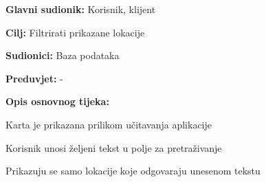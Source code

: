 					\noindent {}
					\begin{packed_item}
	
						\item \textbf{Glavni sudionik: }Korisnik, klijent
						\item  \textbf{Cilj:} Filtrirati prikazane lokacije
						\item  \textbf{Sudionici:} Baza podataka
						\item  \textbf{Preduvjet:} -
						\item  \textbf{Opis osnovnog tijeka:}
						
						\item[] \begin{packed_enum}
	
							\item Karta je prikazana prilikom učitavanja aplikacije
							\item Korisnik unosi željeni tekst u polje za pretraživanje
							\item Prikazuju se samo lokacije koje odgovaraju unesenom tekstu

						\end{packed_enum}
						
					\end{packed_item}
					
